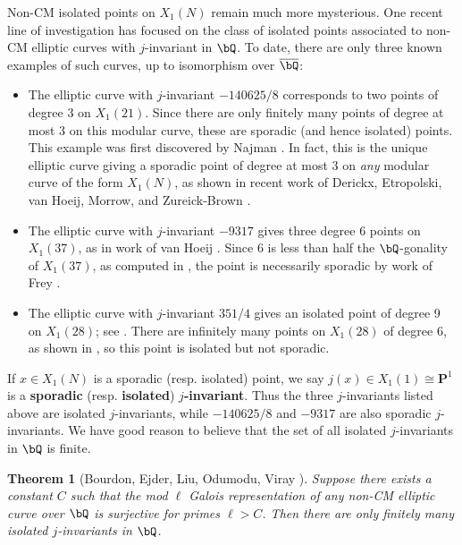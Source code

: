 \documentclass[11pt,reqno]{amsart}
\theoremstyle{plain}
\newtheorem{theorem}{Theorem}%
\theoremstyle{definition}
\newcommand{\Q}{\bQ}
\begin{document}
Non-CM isolated points on $X_1(N)$ remain much more mysterious. One recent line of investigation has focused on the class of isolated points associated to non-CM elliptic curves with $j$-invariant in $\Q$. To date, there are only three known examples of such curves, up to isomorphism over $\overline{\Q}$:
\begin{itemize}
    \item The elliptic curve with $j$-invariant $-140625/8$ corresponds to two points of degree 3 on $X_1(21)$. Since there are only finitely many points of degree at most 3 on this modular curve, these are sporadic (and hence isolated) points. This example was first discovered by Najman \cite{najman16}. In fact, this is the unique elliptic curve giving a sporadic point of degree at most 3 on \emph{any} modular curve of the form $X_1(N)$, as shown in recent work of Derickx, Etropolski, van Hoeij, Morrow, and Zureick-Brown \cite{DEvHMZB2021}.
    
    \item The elliptic curve with $j$-invariant $-9317$ gives three degree 6 points on $X_1(37)$, as in work of van Hoeij \cite{vanHoeij}. Since 6 is less than half the $\Q$-gonality of $X_1(37)$, as computed in \cite{DerickxVanHoeij2014}, the point is necessarily sporadic by work of Frey \cite{frey}.
    
    \item The elliptic curve with $j$-invariant $351/4$ gives an isolated point of degree 9 on $X_1(28)$; see \cite[Theorem 2]{OddDeg}. There are infinitely many points on $X_1(28)$ of degree 6, as shown in \cite{DerickxVanHoeij2014}, so this point is isolated but not sporadic.
\end{itemize}

If $x \in X_1(N)$ is a sporadic (resp. isolated) point, we say $j(x) \in X_1(1) \cong \mathbf{P}^1$ is a \textbf{sporadic} (resp. \textbf{isolated}) \textbf{$j$-invariant}. Thus the three $j$-invariants listed above are isolated $j$-invariants, while $-140625/8$  and $-9317$ are also sporadic $j$-invariants. We have good reason to believe that the set of all isolated $j$-invariants in $\Q$ is finite.
\begin{theorem}[Bourdon, Ejder, Liu, Odumodu, Viray \cite{BELOV}]
\label{BELOVfiniteness}
Suppose there exists a constant $C$ such that the mod $\ell$ Galois representation of any non-CM elliptic curve over $\Q$ is surjective for primes $\ell>C$. Then there are only finitely many isolated $j$-invariants in $\Q$.
\end{theorem}
\end{document}
